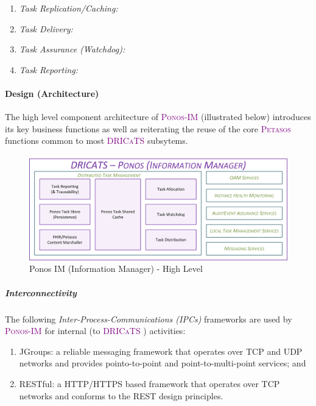 \documentclass[a4paper]{book}
\newcommand{\dricats}{\textsc{\textcolor{Purple}{\small{DRICaTS }}}}
\newcommand{\petasos}{\textsc{\textcolor{Purple}{\small{Petasos }}}}
\newcommand{\ponosim}{\textsc{\textcolor{Purple}{\small{Ponos-IM }}}}
\begin{document}
\begin{enumerate}[noitemsep]
 \item \textit{Task Replication/Caching:}
 \item \textit{Task Delivery:}
 \item \textit{Task Assurance (Watchdog):}
 \item \textit{Task Reporting:}
\end{enumerate}

\paragraph{Design (Architecture)}

The high level component architecture of \ponosim (illustrated below) introduces its key business functions as well as reiterating the reuse of the core \petasos functions common to most \dricats subsytems.
\begin{figure}[h!]
	\begin{adjustbox}{max size={0.98\textwidth}{0.9\textheight}, center}
		\includegraphics[]{diagrams/Ponos-IM-Overview.png}
	\end{adjustbox}
	\caption{Ponos IM (Information Manager) - High Level}
	\label{fig:ponosim-highlevel}
\end{figure}

\subparagraph{Interconnectivity}

The following \textit{Inter-Process-Communications (IPCs)} frameworks are used by \ponosim for internal (to \dricats) activities:
\begin{enumerate}[noitemsep]
 \item JGroups: a reliable messaging framework that operates over TCP and UDP networks and provides pointo-to-point and point-to-multi-point services; and
 \item RESTful: a HTTP/HTTPS based framework that operates over TCP networks and conforms to the REST design principles.
\end{enumerate}
\end{document}

